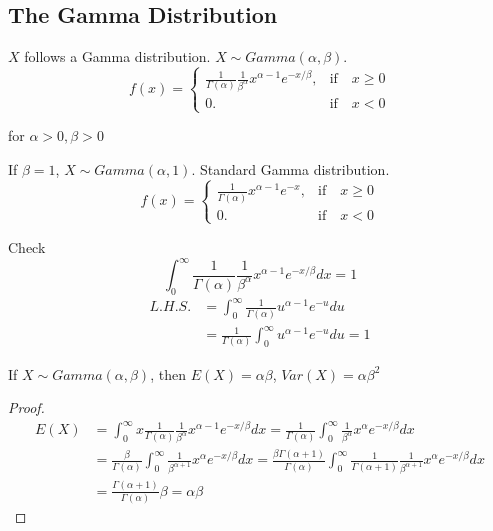 \subsection{The Gamma Distribution}
\begin{defn}
$X$ follows a Gamma distribution. $X \sim Gamma(\alpha,\beta)$.
\[f(x)=\begin{cases}
\frac{1}{\Gamma(\alpha)} \frac{1}{\beta^{\alpha}} x^{\alpha-1} e^{-x/\beta}, & \text{if} \quad x\geq 0\\
0. & \text{if} \quad x < 0
\end{cases}\]

for $\alpha>0, \beta>0$
\end{defn}

If $\beta=1$, $X \sim Gamma(\alpha,1)$. Standard Gamma distribution.
\[f(x)=\begin{cases}
\frac{1}{\Gamma(\alpha)}  x^{\alpha-1} e^{-x}, & \text{if} \quad x\geq 0\\
0. & \text{if} \quad x < 0
\end{cases}\]

Check
\[\int_{0}^{\infty}\frac{1}{\Gamma(\alpha)}  \frac{1}{\beta^{\alpha}} x^{\alpha-1} e^{-x/\beta} dx=1\]
\begin{align*}
L.H.S.&=\int_{0}^{\infty}\frac{1}{\Gamma(\alpha)}   u^{\alpha-1} e^{-u} du \\
&=\frac{1}{\Gamma(\alpha)} \int_{0}^{\infty} u^{\alpha-1} e^{-u} du=1
\end{align*}

\begin{prop}
If $X\sim Gamma(\alpha,\beta)$, then $E(X)=\alpha\beta$, $Var(X)=\alpha\beta^2$
\begin{proof}
\begin{align*}
E(X)&=\int_{0}^{\infty}x \frac{1}{\Gamma(\alpha)} \frac{1}{\beta^{\alpha}} x^{\alpha-1} e^{-x/\beta} dx = \frac{1}{\Gamma(\alpha)} \int_{0}^{\infty} \frac{1}{\beta^{\alpha}} x^{\alpha} e^{-x/\beta} dx  \\
&=\frac{\beta}{\Gamma(\alpha)} \int_{0}^{\infty} \frac{1}{\beta^{\alpha+1}} x^{\alpha} e^{-x/\beta} dx =  \frac{\beta \Gamma(\alpha+1)}{\Gamma(\alpha)} \int_{0}^{\infty}\frac{1}{\Gamma(\alpha+1)}  \frac{1}{\beta^{\alpha+1}} x^{\alpha} e^{-x/\beta} dx \\
&=\frac{\Gamma(\alpha+1)}{\Gamma(\alpha)}\beta =\alpha\beta
\end{align*}
\end{proof}
\end{prop}

